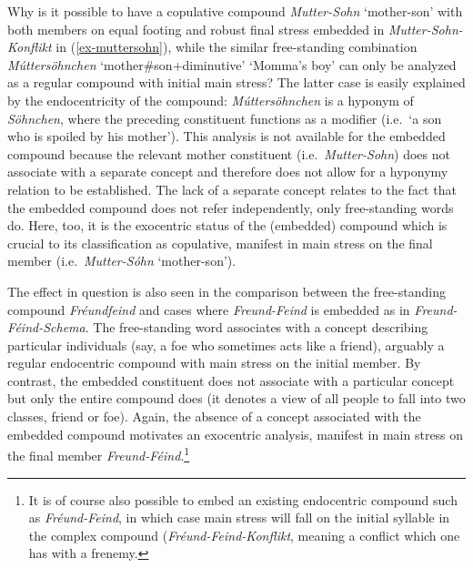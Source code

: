\documentclass[output=paper
 ,nobabel
 ,draftmode
 ,colorlinks, citecolor=brown
]{langscibook}
\begin{document}
\zl

\begin{sloppypar}
\noindent
Why is it possible to have a copulative compound \emph{Mutter-Sohn} `mother-son' with both members
on equal footing and robust final stress embedded in \emph{Mutter-Sohn-Konflikt} in
(\ref{ex-muttersohn}), while the similar free-standing combination \emph{Múttersöhnchen}
`mother\#son+diminutive' `Momma's boy' can only be analyzed as a regular compound with initial main
stress? The latter case is easily explained by the endocentricity of the compound:
\emph{Múttersöhnchen} is a hyponym of \emph{Söhnchen}, where the preceding constituent functions as
a modifier (i.e.\ `a son who is spoiled by his mother'). This analysis is not available for the
embedded compound because the relevant mother constituent (i.e.\ \emph{Mutter-Sohn}) does not
associate with a separate concept and therefore does not allow for a hyponymy relation to be
established. The lack of a separate concept relates to the fact that the embedded compound does not
refer independently, only free-standing words do. Here, too, it is the exocentric status of the
(embedded) compound which is crucial to its classification as copulative, manifest in main stress on
the final member (i.e.\ \emph{Mutter-Sóhn} `mother-son').
\end{sloppypar}

The effect in question is also seen in the comparison between the free-standing compound \emph{Fréundfeind} and cases where \emph{Freund-Feind} is embedded as in \emph{Freund-Féind-Schema}. The free-standing word associates with a concept describing particular individuals (say, a foe who sometimes acts like a friend), arguably a regular endocentric compound with main stress on the initial member. By contrast, the embedded constituent
does not associate with a particular concept but only the entire compound does (it denotes a view of all people to fall into two classes, friend or foe). Again, the absence of a concept associated with the embedded compound motivates an exocentric analysis, manifest in main stress on the final member \emph{Freund-Féind}.\footnote{It is of course also possible to embed an existing endocentric compound such as \emph{Fréund-Feind}, in which case main stress will fall on the initial syllable in the complex compound (\eg \emph{Fréund-Feind-Konflikt}, meaning a conflict which one has with a frenemy.}
\end{document}
